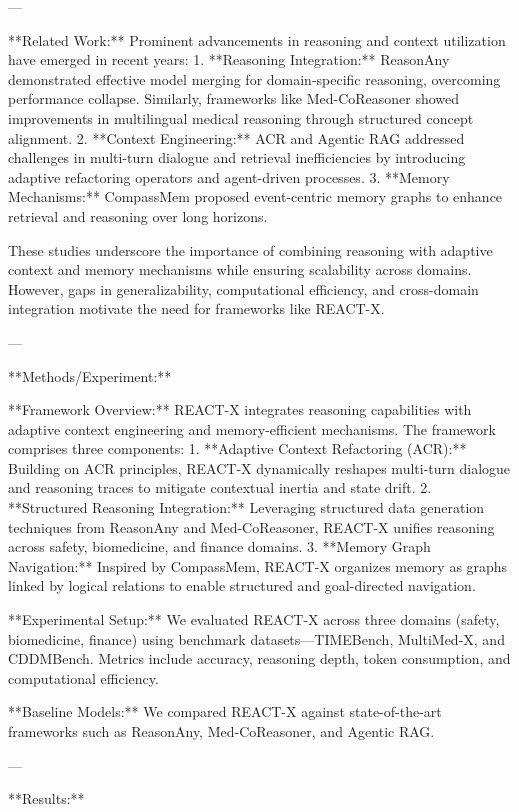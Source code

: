 ---

**Related Work:**  
Prominent advancements in reasoning and context utilization have emerged in recent years:  
1. **Reasoning Integration:** ReasonAny demonstrated effective model merging for domain-specific reasoning, overcoming performance collapse. Similarly, frameworks like Med-CoReasoner showed improvements in multilingual medical reasoning through structured concept alignment.  
2. **Context Engineering:** ACR and Agentic RAG addressed challenges in multi-turn dialogue and retrieval inefficiencies by introducing adaptive refactoring operators and agent-driven processes.  
3. **Memory Mechanisms:** CompassMem proposed event-centric memory graphs to enhance retrieval and reasoning over long horizons.  

These studies underscore the importance of combining reasoning with adaptive context and memory mechanisms while ensuring scalability across domains. However, gaps in generalizability, computational efficiency, and cross-domain integration motivate the need for frameworks like REACT-X.  

---

**Methods/Experiment:**  

**Framework Overview:**  
REACT-X integrates reasoning capabilities with adaptive context engineering and memory-efficient mechanisms. The framework comprises three components:  
1. **Adaptive Context Refactoring (ACR):** Building on ACR principles, REACT-X dynamically reshapes multi-turn dialogue and reasoning traces to mitigate contextual inertia and state drift.  
2. **Structured Reasoning Integration:** Leveraging structured data generation techniques from ReasonAny and Med-CoReasoner, REACT-X unifies reasoning across safety, biomedicine, and finance domains.  
3. **Memory Graph Navigation:** Inspired by CompassMem, REACT-X organizes memory as graphs linked by logical relations to enable structured and goal-directed navigation.  

**Experimental Setup:**  
We evaluated REACT-X across three domains (safety, biomedicine, finance) using benchmark datasets—TIMEBench, MultiMed-X, and CDDMBench. Metrics include accuracy, reasoning depth, token consumption, and computational efficiency.  

**Baseline Models:**  
We compared REACT-X against state-of-the-art frameworks such as ReasonAny, Med-CoReasoner, and Agentic RAG.  

---

**Results:**  

